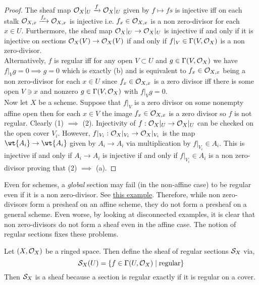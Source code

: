 \documentclass[12pt]{article}
\begin{document}
\begin{proof}
The sheaf map $\struct{X}|_U \xrightarrow{f} \struct{X}|_U$ given by $f \mapsto fs$ is injective iff on each stalk $\stalk{X}{x} \xrightarrow{f_x} \stalk{X}{x}$ is injective i.e. $f_x \in \stalk{X}{x}$ is a non zero-divisor for each $x \in U$. Furthermore, the sheaf map $\struct{X}|_U \to \struct{X}|_U$ is injective if and only if it is injective on sections $\struct{X}(V) \to \struct{X}(V)$ if and only if $f|_V \in \Gamma(V, \struct{X})$ is a non zero-divisor.
\bigskip\\
Alternatively, $f$ is regular iff for any open $V \subset U$ and $g \in \Gamma(V, \struct{X})$ we have $f|_V g = 0 \implies g = 0$ which is exactly (b) and is equivalent to $f_x \in \stalk{X}{x}$ being a non zero-divisor for each $x \in U$ since $f_x \in \stalk{X}{x}$ is a zero divisor iff there is some open $V \ni x$ and nonzero $g \in \Gamma(V, \struct{X})$ with $f|_V g = 0$. 
\bigskip\\
Now let $X$ be a scheme. Suppose that $f |_V$ is a zero divisor on some nonempty affine open then for each $x \in V$ the image $f_x \in \stalk{X}{x}$ is a zero divisor so $f$ is not regular. Clearly (1) $\implies$ (2). Injectivity of $f : \struct{X}|_U \to \struct{X}|_U$ can be checked on the open cover $V_i$. However, $f|_{V_i} : \struct{X}|_{V_i} \to \struct{X}|_{V_i}$ is the map $\wt{A_i} \to \wt{A_i}$ given by $A_i \to A_i$ via multiplication by $f|_{V_i} \in A_i$. This is injective if and only if $A_i \to A_i$ is injective if and only if $f|_{V_i} \in A_i$ is a non zero-divisor proving that (2) $\implies$ (a).
\end{proof}

\begin{rmk}
Even for schemes, a \textit{global} section may fail (in the non-affine case) to be regular even if it is a non zero-divisor. See \href{https://mathoverflow.net/questions/73936/the-restriction-of-a-global-section-which-is-not-a-zero-divisor-is-still-a-non-z}{this example}. Therefore, while non zero-divisors form a presheaf on an affine scheme, they do not form a presheaf on a general scheme. Even worse, by looking at disconnected examples, it is clear that non zero-divisors do not form a sheaf even in the affine case. The notion of regular sections fixes these problems.
\end{rmk}

\begin{definition}
Let $(X, \struct{X})$ be a ringed space. Then define the sheaf of regular sections $\S_X$ via, 
\[ \S_X(U) = \{ f \in \Gamma(U, \struct{X}) \mid \text{regular} \} \]
Then $\S_X$ is a sheaf because a section is regular exactly if it is regular on a cover.
\end{definition}
\end{document}
